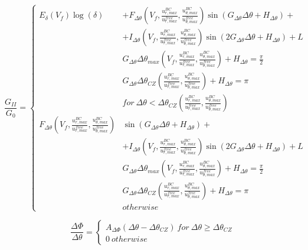 \documentclass[review]{elsarticle}
\begin{document}
\begin{equation}
\frac{G_{II}}{G_{0}}=\begin{cases}
E_{\delta}\left(V_{f}\right)\log\left(\delta\right)&+F_{\Delta\theta}\left(V_{f},\frac{u^{BC}_{r,max}}{u^{free}_{r,max}},\frac{u^{BC}_{\theta,max}}{u^{free}_{\theta,max}}\right)\sin\left(G_{\Delta\theta}\Delta\theta+H_{\Delta\theta}\right)+\\&+I_{\Delta\theta}\left(V_{f},\frac{u^{BC}_{r,max}}{u^{free}_{r,max}},\frac{u^{BC}_{\theta,max}}{u^{free}_{\theta,max}}\right)\sin\left(2G_{\Delta\theta}\Delta\theta+H_{\Delta\theta}\right)+L\\
&G_{\Delta\theta}\Delta\theta_{max}\left(V_{f},\frac{u^{BC}_{r,max}}{u^{free}_{r,max}},\frac{u^{BC}_{\theta,max}}{u^{free}_{\theta,max}}\right)+H_{\Delta\theta}=\frac{\pi}{2}\\
&G_{\Delta\theta}\Delta\theta_{CZ}\left(\frac{u^{BC}_{r,max}}{u^{free}_{r,max}},\frac{u^{BC}_{\theta,max}}{u^{free}_{\theta,max}}\right)+H_{\Delta\theta}=\pi\\
&for\ \Delta\theta<\Delta\theta_{CZ}\left(\frac{u^{BC}_{r,max}}{u^{free}_{r,max}},\frac{u^{BC}_{\theta,max}}{u^{free}_{\theta,max}}\right)\\
F_{\Delta\theta}\left(V_{f},\frac{u^{BC}_{r,max}}{u^{free}_{r,max}},\frac{u^{BC}_{\theta,max}}{u^{free}_{\theta,max}}\right)&\sin\left(G_{\Delta\theta}\Delta\theta+H_{\Delta\theta}\right)+\\&+I_{\Delta\theta}\left(V_{f},\frac{u^{BC}_{r,max}}{u^{free}_{r,max}},\frac{u^{BC}_{\theta,max}}{u^{free}_{\theta,max}}\right)\sin\left(2G_{\Delta\theta}\Delta\theta+H_{\Delta\theta}\right)+L\\
&G_{\Delta\theta}\Delta\theta_{max}\left(V_{f},\frac{u^{BC}_{r,max}}{u^{free}_{r,max}},\frac{u^{BC}_{\theta,max}}{u^{free}_{\theta,max}}\right)+H_{\Delta\theta}=\frac{\pi}{2}\\
&G_{\Delta\theta}\Delta\theta_{CZ}\left(\frac{u^{BC}_{r,max}}{u^{free}_{r,max}},\frac{u^{BC}_{\theta,max}}{u^{free}_{\theta,max}}\right)+H_{\Delta\theta}=\pi\\
&otherwise
\end{cases}
\end{equation}

\begin{equation}
\frac{\Delta\Phi}{\Delta\theta}=\begin{cases}
A_{\Delta\Phi}\left(\Delta\theta-\Delta\theta_{CZ}\right)\ for\ \Delta\theta\geq\Delta\theta_{CZ}\\
0\ otherwise
\end{cases}
\end{equation}
\end{document}
